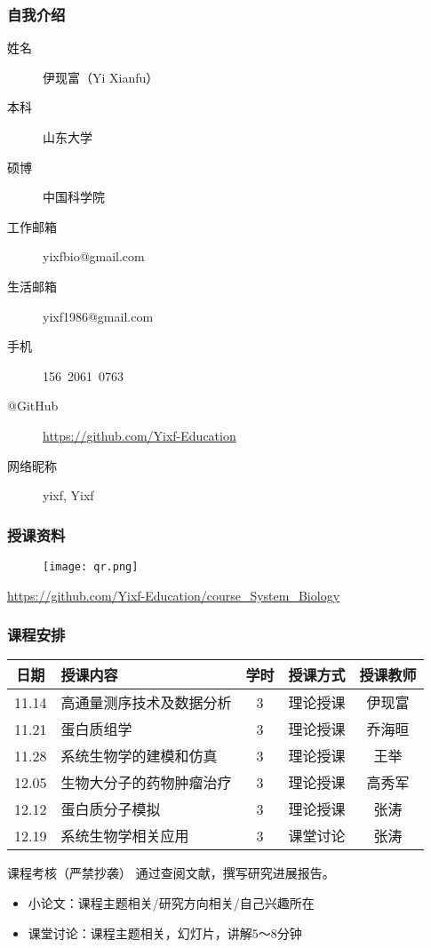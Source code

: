 \begin{frame}
  \frametitle{自我介绍}
    \begin{description}
      \item[姓\qquad 名]伊现富（Yi Xianfu）
      \item[本\qquad 科]山东大学
      \item[硕\qquad 博]中国科学院
      \item[工作邮箱]\alert{yixfbio@gmail.com}
      \item[生活邮箱]yixf1986@gmail.com
      \item[手\qquad 机]\alert{156\ 2061\ 0763}
      \item[@GitHub]\alert{\href{https://github.com/Yixf-Education}{https://github.com/Yixf-Education}}
      \item[网络昵称]yixf, Yixf
    \end{description}
\end{frame}

\begin{frame}
  \frametitle{授课资料}
  \begin{figure}
    \centering
    \texttt{[image: qr.png]}
  \end{figure}
  \begin{center}
  \href{https://github.com/Yixf-Education/course_System_Biology}{https://github.com/Yixf-Education/course\_System\_Biology}
  \end{center}
\end{frame}

\begin{frame}
  \frametitle{课程安排}
  \begin{table}
    \centering
    \begin{tabular}{clccc}
      \hline
      \rowcolor{blue!50}日期 & 授课内容 & 学时 & 授课方式 & 授课教师\\
      \hline
      11.14 & 高通量测序技术及数据分析 & 3 & 理论授课 & 伊现富\\
      11.21 & 蛋白质组学 & 3 & 理论授课 & 乔海晅\\
      11.28 & 系统生物学的建模和仿真 & 3 & 理论授课 & 王举\\
      12.05 & 生物大分子的药物肿瘤治疗 & 3 & 理论授课 & 高秀军\\
      12.12 & 蛋白质分子模拟 & 3 & 理论授课 & 张涛\\
      12.19 & 系统生物学相关应用 & 3 & 课堂讨论 & 张涛\\
      \hline
    \end{tabular}
  \end{table}
  \vspace{-1em}
  \begin{block}{课程考核（\alert{严禁抄袭}）}
    通过查阅文献，撰写研究进展报告。
    \begin{itemize}
      \item 小论文：课程主题相关/研究方向相关/自己兴趣所在
      \item 课堂讨论：课程主题相关，幻灯片，讲解5～8分钟
    \end{itemize}
  \end{block}
\end{frame}
